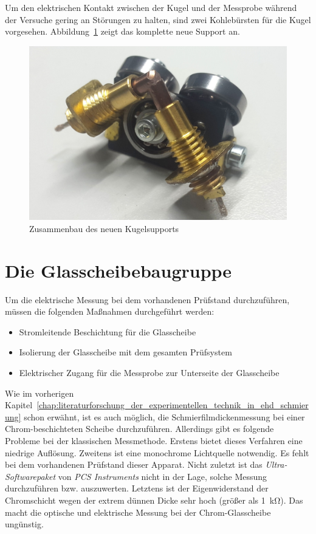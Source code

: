 Um den elektrischen Kontakt zwischen der Kugel und der Messprobe während der Versuche gering an Störungen zu halten, sind zwei Kohlebürsten für die Kugel vorgesehen.
Abbildung~\ref{fig:das_komplette_kugelsupports} zeigt das komplette neue Support an.

\begin{figure}[htb]
    \centering
    \includegraphics[width=0.5\linewidth]{./images/kugelsupport_full.jpg}
    \caption{Zusammenbau des neuen Kugelsupports}
    \label{fig:das_komplette_kugelsupports}
\end{figure}

\section{Die Glasscheibebaugruppe}
\label{sec:die_glasscheibebaugruppe}

Um die elektrische Messung bei dem vorhandenen Prüfstand durchzuführen, müssen die folgenden Maßnahmen durchgeführt werden:
\begin{itemize}
    \item Stromleitende Beschichtung für die Glasscheibe
    \item Isolierung der Glasscheibe mit dem gesamten Prüfsystem
    \item Elektrischer Zugang für die Messprobe zur Unterseite der Glasscheibe
\end{itemize}

Wie im vorherigen Kapitel~\ref{chap:literaturforschung_der_experimentellen_technik_in_ehd_schmierung} schon erwähnt, ist es auch möglich, die Schmierfilmdickenmessung bei einer Chrom-beschichteten Scheibe durchzuführen.
Allerdings gibt es folgende Probleme bei der klassischen Messmethode.
Erstens bietet dieses Verfahren eine niedrige Auflösung.
Zweitens ist eine monochrome Lichtquelle notwendig.
Es fehlt bei dem vorhandenen Prüfstand dieser Apparat.
Nicht zuletzt ist das \textit{Ultra-Softwarepaket} von \textit{PCS Instruments} nicht in der Lage, solche Messung durchzuführen bzw. auszuwerten.
Letztens ist der Eigenwiderstand der Chromschicht wegen der extrem dünnen Dicke sehr hoch (größer als \SI{1}{\kilo\ohm}).
Das macht die optische und elektrische Messung bei der Chrom-Glasscheibe ungünstig.


